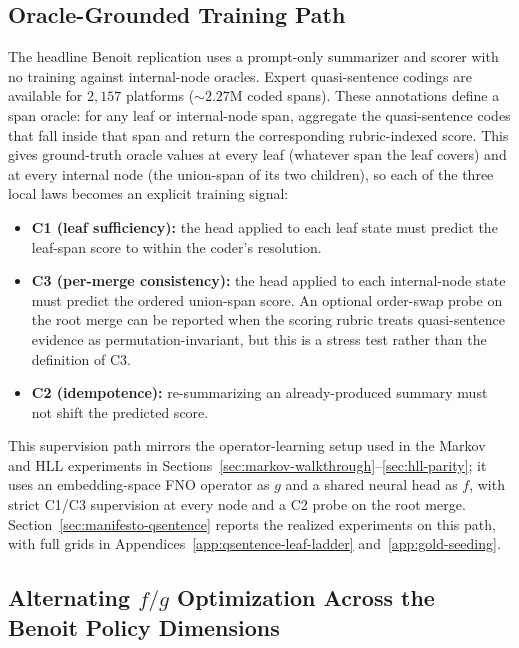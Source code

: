 \subsection{Oracle-Grounded Training Path}

The headline Benoit replication uses a prompt-only summarizer and
scorer with no training against internal-node oracles. Expert
quasi-sentence codings are available for $2{,}157$ platforms
($\sim\!2.27$M coded spans). These annotations define a span oracle:
for any leaf or internal-node span, aggregate the quasi-sentence codes
that fall inside that span and return the corresponding rubric-indexed
score. This gives ground-truth oracle values at every leaf (whatever
span the leaf covers) and at every internal node (the union-span of its
two children), so each of the three local laws becomes an explicit
training signal:

\begin{itemize}[leftmargin=1.5em]
    \item \textbf{C1 (leaf sufficiency):} the head applied to each
          leaf state must predict the leaf-span score to within the
          coder's resolution.
    \item \textbf{C3 (per-merge consistency):} the head applied to each
          internal-node state must predict the ordered union-span score.
          An optional order-swap probe on the root merge can be reported
          when the scoring rubric treats quasi-sentence evidence as
          permutation-invariant, but this is a stress test rather than
          the definition of C3.
    \item \textbf{C2 (idempotence):} re-summarizing an already-produced
          summary must not shift the predicted score.
\end{itemize}

This supervision path mirrors the operator-learning setup used in the
Markov and HLL experiments in
Sections~\ref{sec:markov-walkthrough}--\ref{sec:hll-parity}; it uses
an embedding-space FNO operator as $g$ and a shared neural head as
$f$, with strict C1/C3 supervision at every node and a C2 probe on
the root merge. Section~\ref{sec:manifesto-qsentence} reports the
realized experiments on this path, with full grids in
Appendices~\ref{app:qsentence-leaf-ladder}
and~\ref{app:gold-seeding}.

\subsection[Alternating f/g Optimization Across the Benoit Dimensions]{Alternating $f/g$ Optimization Across the Benoit
Policy Dimensions}\label{app:rile-fg-ladder}

